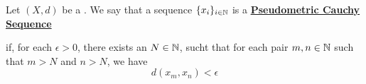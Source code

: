 \label{def:pseudometriccauchysequence}
\newcommand{\PseudometricCauchySequence}[0]{
    \bf \hyperref[def:pseudometriccauchysequence]{Pseudometric Cauchy Sequence} \rm
}
\begin{df}

    Let $(X,d)$ be a \PseudometricSpace.
    We say that a sequence $\{x_i\}_{i \in \mathbb{N}}$ is a \PseudometricCauchySequence
    if, for each $\epsilon > 0$, there exists an $N \in \mathbb{N}$, sucht that for 
    each pair $m,n \in \mathbb{N}$ such that $m>N$ and $n>N$, we have 
    \begin{equation}
        d(x_m,x_n) < \epsilon
    \end{equation}
\end{df}